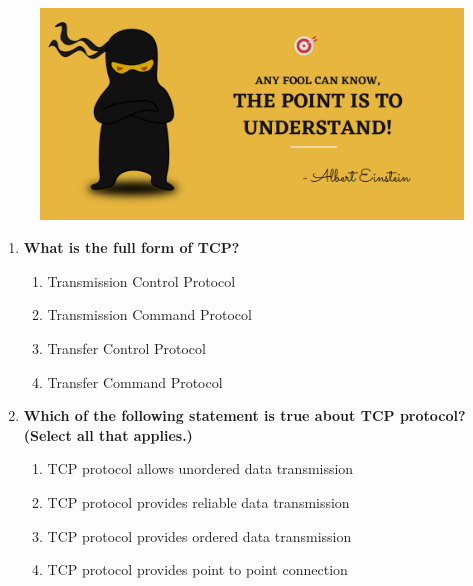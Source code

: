 \setlength{\columnsep}{3pt}
\begin{flushleft}
	
	\paragraph{}
	\bigskip
	
	\begin{figure}[h!]
		\centering
		\includegraphics[scale=.2]{content/practise.jpg}
	\end{figure}	
	\begin{enumerate}
		
		\item \textbf{What is the full form of TCP?}
		\begin{enumerate}[label=(\alph*)]
			\item Transmission Control Protocol  %
			\item Transmission Command Protocol
			\item Transfer Control Protocol
			\item Transfer Command Protocol
		\end{enumerate}
		\bigskip
		\bigskip
		
		\item \textbf{Which of the following statement is true about TCP protocol? (Select all that applies.)}
		\begin{enumerate}[label=(\alph*)]
			\item TCP protocol allows unordered data transmission
			\item TCP protocol provides reliable data transmission %
			\item TCP protocol provides ordered data transmission  %
			\item TCP protocol provides point to point connection  %
		\end{enumerate}
		\bigskip
		\bigskip	
		

\end{enumerate}
\end{flushleft}
